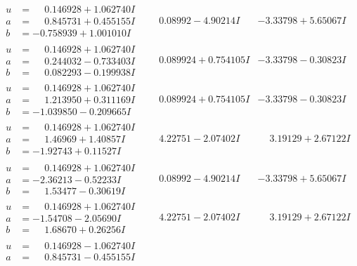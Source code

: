 \documentclass[1p]{elsarticle_modified}
\theoremstyle{definition}
\begin{document}
$$\begin{array}{c|c|c}
\begin{aligned}
u &= \phantom{-}0.146928 + 1.062740 I \\
a &= \phantom{-}0.845731 + 0.455155 I \\
b &= -0.758939 + 1.001010 I\end{aligned}
 & \phantom{-}0.08992 - 4.90214 I & -3.33798 + 5.65067 I \\ \hline\begin{aligned}
u &= \phantom{-}0.146928 + 1.062740 I \\
a &= \phantom{-}0.244032 - 0.733403 I \\
b &= \phantom{-}0.082293 - 0.199938 I\end{aligned}
 & \phantom{-}0.089924 + 0.754105 I & -3.33798 - 0.30823 I \\ \hline\begin{aligned}
u &= \phantom{-}0.146928 + 1.062740 I \\
a &= \phantom{-}1.213950 + 0.311169 I \\
b &= -1.039850 - 0.209665 I\end{aligned}
 & \phantom{-}0.089924 + 0.754105 I & -3.33798 - 0.30823 I \\ \hline\begin{aligned}
u &= \phantom{-}0.146928 + 1.062740 I \\
a &= \phantom{-}1.46969 + 1.40857 I \\
b &= -1.92743 + 0.11527 I\end{aligned}
 & \phantom{-}4.22751 - 2.07402 I & \phantom{-}3.19129 + 2.67122 I \\ \hline\begin{aligned}
u &= \phantom{-}0.146928 + 1.062740 I \\
a &= -2.36213 - 0.52233 I \\
b &= \phantom{-}1.53477 - 0.30619 I\end{aligned}
 & \phantom{-}0.08992 - 4.90214 I & -3.33798 + 5.65067 I \\ \hline\begin{aligned}
u &= \phantom{-}0.146928 + 1.062740 I \\
a &= -1.54708 - 2.05690 I \\
b &= \phantom{-}1.68670 + 0.26256 I\end{aligned}
 & \phantom{-}4.22751 - 2.07402 I & \phantom{-}3.19129 + 2.67122 I \\ \hline\begin{aligned}
u &= \phantom{-}0.146928 - 1.062740 I \\
a &= \phantom{-}0.845731 - 0.455155 I \\

\end{aligned}
\end{array}$$
\end{document}
